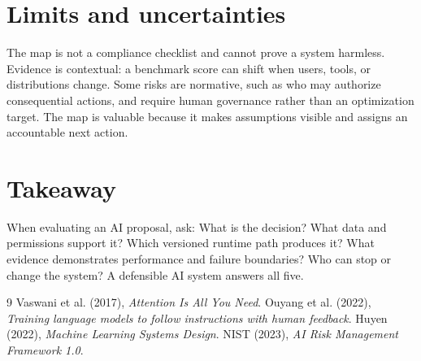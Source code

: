 \documentclass[11pt]{article}
\begin{document}
\section{Limits and uncertainties}
The map is not a compliance checklist and cannot prove a system harmless. Evidence is contextual: a benchmark score can shift when users, tools, or distributions change. Some risks are normative, such as who may authorize consequential actions, and require human governance rather than an optimization target. The map is valuable because it makes assumptions visible and assigns an accountable next action.

\section{Takeaway}
When evaluating an AI proposal, ask: What is the decision? What data and permissions support it? Which versioned runtime path produces it? What evidence demonstrates performance and failure boundaries? Who can stop or change the system? A defensible AI system answers all five.
\begin{thebibliography}{9}
 Vaswani et al. (2017), \emph{Attention Is All You Need}.
 Ouyang et al. (2022), \emph{Training language models to follow instructions with human feedback}.
 Huyen (2022), \emph{Machine Learning Systems Design}.
 NIST (2023), \emph{AI Risk Management Framework 1.0}.
\end{thebibliography}
\end{document}
